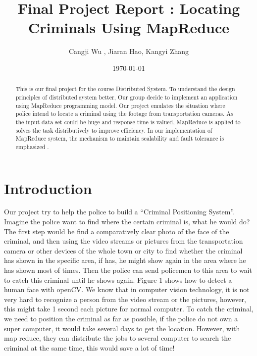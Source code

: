 \documentclass[12pt]{article}
\begin{document}
\title{Final Project Report : Locating Criminals Using MapReduce}
\author{Cangji Wu , Jiaran Hao, Kangyi Zhang}
\date{\today}
\maketitle

\begin{abstract}
This is our final project for the course Distributed System. To understand the design principles
of distributed system better, Our group decide to implement an application using MapReduce programming model. 
Our project emulates the situation where police intend to locate a criminal using the footage from transportation cameras. 
As the input data set could be huge and response time is valued, MapReduce is applied to solves the task distributively to
improve efficiency. In our implementation of MapReduce system, the mechanism to maintain scalability and fault tolerance is emphasized
. 
\end{abstract} 

\section {Introduction}

Our project try to help the police to build a “Criminal Positioning System”. Imagine the police want to find where the certain criminal is, what he would do?
The first step would be find a comparatively clear photo of the face of the criminal, and then using the video streams or pictures from the transportation camera or other devices of the whole town or city to find whether the criminal has shown in the specific area, if has, he might show again in the area where he has shown most of times. Then the police can send policemen to this area to wait to catch this criminal until he shows again. Figure 1 shows how to detect a human face with openCV.
We know that in computer vision technology, it is not very hard to recognize a person from the video stream or the pictures, however, this might take 1 second each picture for normal computer. To catch the criminal, we need to position the criminal as far as possible, if the police do not own a super computer, it would take several days to get the location. However, with map reduce, they can distribute the jobs to several computer to search the criminal at the same time, this would save a lot of time!
\end{document}

